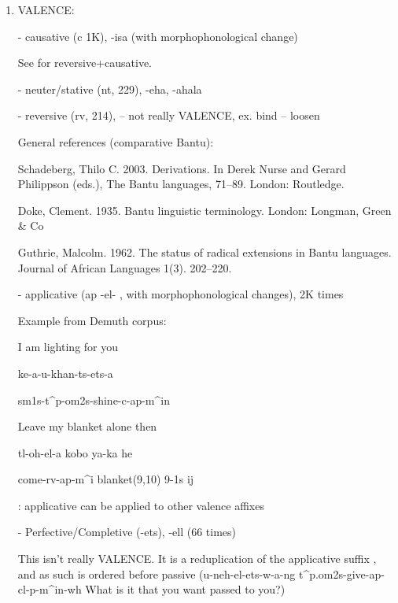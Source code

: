 \begin{enumerate}
    \item VALENCE:
    
    
    
    - causative (c 1K), -isa (with morphophonological change) \cite[]{doke1967textbook}
    
    See \cite[]{doke1967textbook} for reversive+causative.
    
    - neuter/stative (nt, 229), -eha, -ahala \cite[]{doke1967textbook}
    
    
    - reversive (rv, 214),  \cite[]{doke1967textbook} -- not really VALENCE, ex. bind -- loosen
    
    General references (comparative Bantu):

Schadeberg, Thilo C. 2003. Derivations. In Derek Nurse and Gerard Philippson (eds.), The
Bantu languages, 71–89. London: Routledge.

Doke, Clement. 1935. Bantu linguistic terminology. London: Longman, Green \& Co

Guthrie, Malcolm. 1962. The status of radical extensions in Bantu languages. Journal of
African Languages 1(3). 202–220.

    
    
    - applicative
    (ap -el- \cite[]{doke1967textbook} \cite[p. 109]{lombard1969handbook}, with morphophonological changes), 2K times
    
    Example from Demuth corpus: 
    
    I am lighting for you
    
    ke-a-u-khan-ts-ets-a
    
    sm1s-t\^{}p-om2s-shine-c-ap-m\^{}in
    
    
    Leave my blanket alone then
    
    tl-oh-el-a kobo ya-ka he
    
    come-rv-ap-m\^{}i blanket(9,10) 9-1s ij
    
    
    \cite[-315]{doke1967textbook}: applicative can be applied to other valence affixes
    
    -  Perfective/Completive (-ets), -ell (66 times) \cite[]{doke1967textbook}
    
    This isn't really VALENCE. It is a reduplication of the applicative suffix \cite[]{doke1967textbook}, and as such is ordered before passive (u-neh-el-ets-w-a-ng t\^{}p.om2s-give-ap-cl-p-m\^{}in-wh What is it that you want passed to you?)
    

\end{enumerate}
